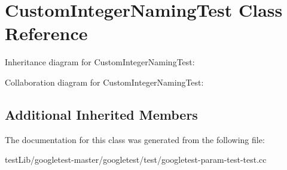 \hypertarget{classCustomIntegerNamingTest}{}\section{Custom\+Integer\+Naming\+Test Class Reference}
\label{classCustomIntegerNamingTest}


Inheritance diagram for Custom\+Integer\+Naming\+Test\+:


Collaboration diagram for Custom\+Integer\+Naming\+Test\+:
\subsection*{Additional Inherited Members}


The documentation for this class was generated from the following file\+:\begin{DoxyCompactItemize}
\item 
test\+Lib/googletest-\/master/googletest/test/googletest-\/param-\/test-\/test.\+cc\end{DoxyCompactItemize}
